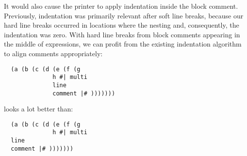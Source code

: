 It would also cause the printer to apply indentation inside the block comment.
Previously, indentation was primarily relevant after soft line breaks,
because our hard line breaks occurred in locations where the nesting and,
consequently, the indentation was zero.
With hard line breaks from block comments appearing in the middle of expressions,
we can profit from the existing indentation algorithm to align comments appropriately:
\begin{verbatim}
  (a (b (c (d (e (f (g
              h #| multi
              line
              comment |# )))))))
\end{verbatim}
looks a lot better than:
\begin{verbatim}
  (a (b (c (d (e (f (g
              h #| multi
  line
  comment |# )))))))
\end{verbatim}

